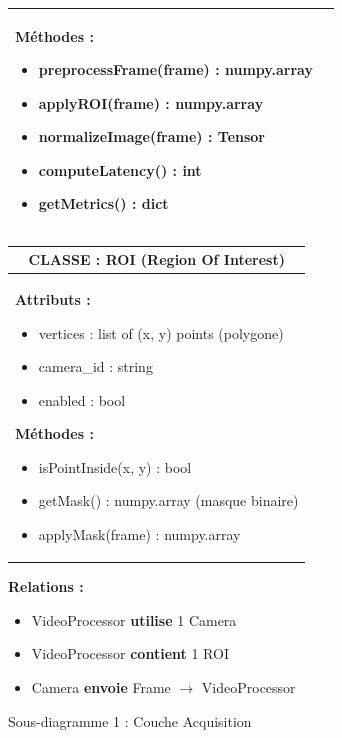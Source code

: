 \begin{figure}[H]
{\begin{minipage}{0.95\textwidth}
\begin{tabular}{|p{2.5cm}|p{7cm}|}
{    \textbf{Méthodes :}
    \begin{itemize}
        \item preprocessFrame(frame) : numpy.array
        \item applyROI(frame) : numpy.array
        \item normalizeImage(frame) : Tensor
        \item computeLatency() : int
        \item getMetrics() : dict
    \end{itemize}
    } \\
    \hline
    \end{tabular}
    
    \vspace{0.5cm}
    
    \begin{tabular}{|p{2.5cm}|p{7cm}|}
    \hline
    \multicolumn{2}{|c|}{\textbf{CLASSE : ROI (Region Of Interest)}} \\
    \hline
    \multicolumn{2}{|p{9.5cm}|}{
    \textbf{Attributs :}
    \begin{itemize}
        \item vertices : list of (x, y) points (polygone)
        \item camera\_id : string
        \item enabled : bool
    \end{itemize}
    
    \textbf{Méthodes :}
    \begin{itemize}
        \item isPointInside(x, y) : bool
        \item getMask() : numpy.array (masque binaire)
        \item applyMask(frame) : numpy.array
    \end{itemize}
    } \\
    \hline
    \end{tabular}
    
    \vspace{0.5cm}
    
    \textbf{Relations :}
    \begin{itemize}
        \item VideoProcessor \textbf{utilise} 1 Camera
        \item VideoProcessor \textbf{contient} 1 ROI
        \item Camera \textbf{envoie} Frame $\rightarrow$ VideoProcessor
    \end{itemize}
    
    \end{minipage}}
    \caption{Sous-diagramme 1 : Couche Acquisition}
    \label{fig:class-acquisition}
\end{figure}


